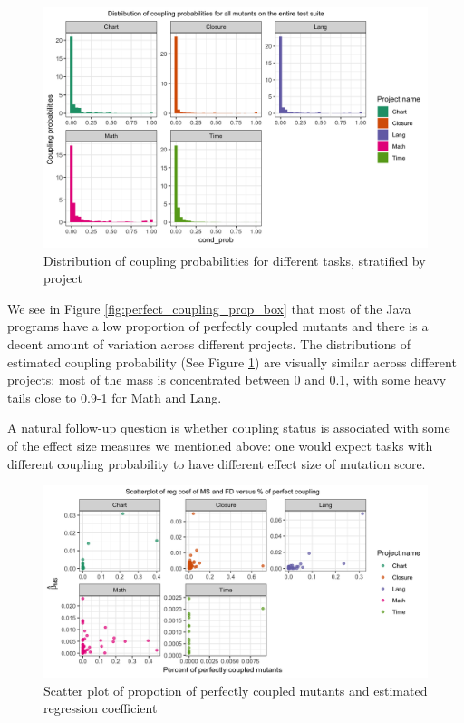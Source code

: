 \documentclass[10pt,letterpaper]{article}
\begin{document}
      \begin{figure}[ht!]
        \centering
        \includegraphics[scale=0.1]{figures/distri_coupling_prop.png}
        \caption{Distribution of coupling probabilities for different tasks, stratified by project}
        \label{fig:distri_coupling_prop}
    \end{figure}

    We see in Figure \ref{fig:perfect_coupling_prop_box} that most of the Java programs have a low proportion of perfectly coupled mutants and there is a decent amount of variation across different projects. The distributions of estimated coupling probability (See Figure \ref{fig:distri_coupling_prop}) are visually similar across different projects: most of the mass is concentrated between 0 and 0.1, with some heavy tails close to 0.9-1 for Math and Lang.


    A natural follow-up question is whether coupling status is associated with some of the effect size measures we mentioned above: one would expect tasks with different coupling probability to have different effect size of mutation score. 


  \begin{figure}[ht!]
        \centering
        \includegraphics[scale=0.15]{figures/couple_reg_coef.png}
        \caption{Scatter plot of propotion of perfectly coupled mutants and estimated regression coefficient }
        \label{fig:couple_reg_coef}
    \end{figure}
\end{document}
